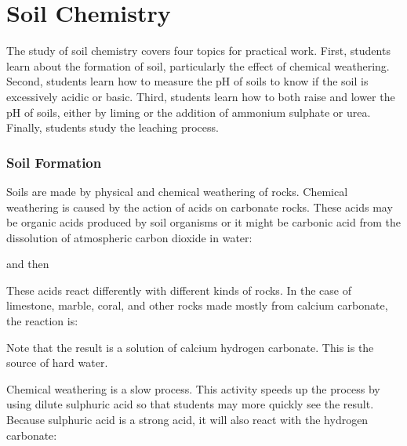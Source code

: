 \chapter{Soil Chemistry}

The study of soil chemistry covers four topics for practical work. First, students learn about the formation of soil, particularly the effect of chemical weathering. Second, students learn how to measure the pH of soils to know if the soil is excessively acidic or basic. Third, students learn how to both raise and lower the pH of soils, either by liming or the addition of ammonium sulphate or urea. Finally, students study the leaching process.

\subsection{Soil Formation}

Soils are made by physical and chemical weathering of rocks. Chemical weathering is caused by the action of acids on carbonate rocks. These acids may be organic acids produced by soil organisms or it might be carbonic acid from the dissolution of atmospheric carbon dioxide in water:

\begin{center}
\end{center}

and then

\begin{center}
\end{center}

These acids react differently with different kinds of rocks. In the case of limestone, marble, coral, and other rocks made mostly from calcium carbonate, the reaction is:

\begin{center}
\end{center}

Note that the result is a solution of calcium hydrogen carbonate. This is the source of hard water.

Chemical weathering is a slow process. This activity speeds up the process by using dilute sulphuric acid so that students may more quickly see the result. Because sulphuric acid is a strong acid, it will also react with the hydrogen carbonate:

